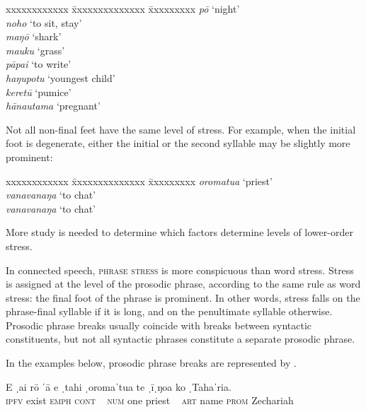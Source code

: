 \ea
\begin{tabbing}
 xxxxxxxxxxxx \= xxxxxxxxxxxxxx \= xxxxxxxxx \kill
  \textit{pō} \>  \> ‘night’\\
  \textit{noho} \>  \> ‘to sit, stay’\\
 \textit{maŋō} \>  \> ‘shark’\\
 \textit{mauku} \>  \> ‘grass’\\
 \textit{pāpa{\ꞌ}i} \>  \> ‘to write’\\
 \textit{haŋupotu} \>  \> ‘youngest child’\\
 \textit{keretū} \>  \> ‘pumice’\\
 \textit{hānautama} \>  \> ‘pregnant’
\end{tabbing}
\z 
Not all non-final feet have the same level of stress. For example, when the initial foot is degenerate, either the initial or the second syllable may be slightly more prominent:

\ea
\begin{tabbing}
 xxxxxxxxxxxx \= xxxxxxxxxxxxxx \= xxxxxxxxx \kill
 \textit{oromatu{\ꞌ}a} \>  \> ‘priest’\\
 \textit{vanavanaŋa}  \>  \> ‘to chat’\\
 \textit{vanavanaŋa} \>  \> ‘to chat’
\end{tabbing}
\z
More study is needed to determine which factors determine levels of lower-order stress.

In connected speech, \textsc{phrase stress} is more conspicuous than word stress. Stress is assigned at the level of the prosodic phrase, according to the same rule as word stress: the final foot of the phrase is prominent. In other words, stress falls on the phrase-final syllable if it is long, and on the penultimate syllable otherwise. Prosodic phrase breaks usually coincide with breaks between syntactic constituents, but not all syntactic phrases constitute a separate prosodic phrase.

In the examples below, prosodic phrase breaks are represented by {\textbar}. 

\ea\label{ex:2.2}
\gll E ˌai rō ˈ{\ꞌ}ā {\textup{\textbar}} e ˌtahi ˌoromaˈtu{\ꞌ}a {\textup{\textbar}} te ˌ{\ꞌ}īˌŋoa  ko ˌTahaˈria.\\
\textsc{ipfv} exist \textsc{emph} \textsc{cont} ~ \textsc{num} one priest ~ \textsc{art} name \textsc{prom} Zechariah\\
[ʔeˌairoːˈʔaː  ʔeˌtahiˌoromaˈtuʔa  teˌʔiːˌŋoakoˌtahaˈria]\\


